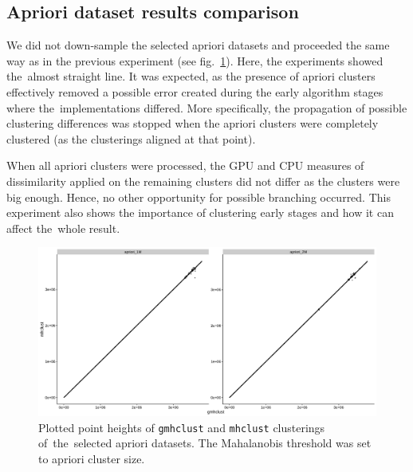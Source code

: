 \subsection{Apriori dataset results comparison}

We did not down-sample the selected apriori datasets and proceeded the same way as in the previous experiment (see fig.~\ref{fig04:apriori_result}). Here, the experiments showed the~almost straight line. It was expected, as the presence of apriori clusters effectively removed a possible error created during the early algorithm stages where the~implementations differed. More specifically, the propagation of possible clustering differences was stopped when the apriori clusters were completely clustered (as the clusterings aligned at that point).

When all apriori clusters were processed, the GPU and CPU measures of dissimilarity applied on the remaining clusters did not differ as the clusters were big enough. Hence, no other opportunity for possible branching occurred. This experiment also shows the importance of clustering early stages and how it can affect the~whole result.

\begin{figure}\centering
	\includegraphics[width=\linewidth]{img/apriori_result}
	\caption{Plotted point heights of \texttt{gmhclust} and \texttt{mhclust} clusterings of~the~selected apriori datasets. The Mahalanobis threshold was set to apriori cluster size.}
	\label{fig04:apriori_result}
\end{figure}

